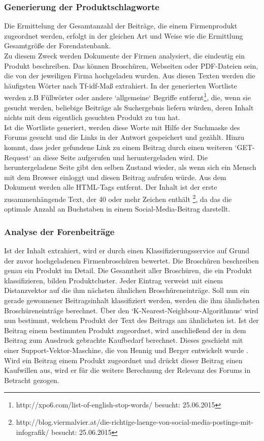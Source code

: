\subsubsection{Generierung der Produktschlagworte}
Die Ermittelung der Gesamtanzahl der Beiträge, die einem Firmenprodukt zugeordnet werden, erfolgt in der gleichen Art und Weise wie die Ermittlung Gesamtgröße der Forendatenbank.\\
Zu diesem Zweck werden Dokumente der Firmen analysiert, die eindeutig ein Produkt beschreiben. Das können Broschüren, Webseiten oder PDF-Dateien sein, die von der jeweiligen Firma hochgeladen wurden. Aus diesen Texten werden die häufigsten Wörter nach Tf-idf-Maß extrahiert. In der generierten Wortliste werden z.B Füllwörter oder andere `allgemeine` Begriffe entfernt\footnote{http://xpo6.com/list-of-english-stop-words/ besucht: 25.06.2015}, die, wenn sie gesucht werden,  beliebige Beiträge als Suchergebnis liefern würden, deren Inhalt nichts mit dem eigentlich gesuchten Produkt zu tun hat.\\
Ist die Wortliste generiert, werden diese Worte mit Hilfe der Suchmaske des Forums gesucht und die Links in der Antwort gespeichert und gezählt. Hinzu kommt, dass jeder gefundene Link zu einem Beitrag durch einen weiteren `GET-Request` an diese Seite aufgerufen und heruntergeladen wird. Die heruntergeladene Seite gibt den selben Zustand wieder, als wenn sich ein Mensch mit dem Browser einloggt und diesen Beitrag aufrufen würde. Aus dem Dokument werden alle HTML-Tags entfernt. Der Inhalt ist der erste zusammenhängende Text, der 40 oder mehr Zeichen enthält \footnote{http://blog.viermalvier.at/die-richtige-laenge-von-social-media-postings-mit-infografik/ besucht: 25.06.2015}, da das die optimale Anzahl an Buchstaben in einem Social-Media-Beitrag darstellt.

\subsubsection{Analyse der Forenbeiträge}
Ist der Inhalt extrahiert, wird er durch einen Klassifizierungsservice auf Grund der zuvor hochgeladenen Firmenbroschüren bewertet. Die Broschüren beschreiben genau ein Produkt im Detail. Die Gesamtheit aller Broschüren, die ein Produkt klassifizieren, bilden Produktcluster. Jeder Eintrag verweist mit einem Distanzvektor auf die ihm nächsten ähnlichen Broschüreneinträge. Soll nun ein gerade gewonnener Beitragsinhalt klassifiziert werden, werden die ihm ähnlichsten Broschüreneinträge berechnet. Über den `K-Nearest-Neighbour-Algorithmus` wird nun bestimmt, welchem Produkt der Text des Beitrags am ähnlichsten ist. Ist der Beitrag einem bestimmten Produkt zugeordnet, wird anschließend der in dem Beitrag zum Ausdruck gebrachte Kaufbedarf berechnet. Dieses geschieht mit einer Support-Vektor-Maschine, die von Hennig und Berger entwickelt wurde \cite{n2o}.\\
Wird ein Beitrag einem Produkt zugeordnet und drückt dieser Beitrag einen Kaufwillen aus, wird er für die weitere Berechnung der Relevanz des Forums in Betracht gezogen.

